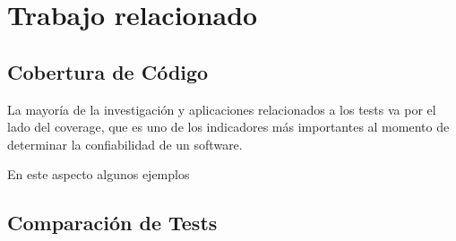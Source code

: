 \chapter{Trabajo relacionado}

\section{Cobertura de Código}
\par La mayoría de la investigación y aplicaciones relacionados a los tests va por el lado del coverage, que es uno de los indicadores más importantes al momento de determinar la confiabilidad de un software. 
\par En este aspecto algunos ejemplos 

\section{Comparación de Tests}
